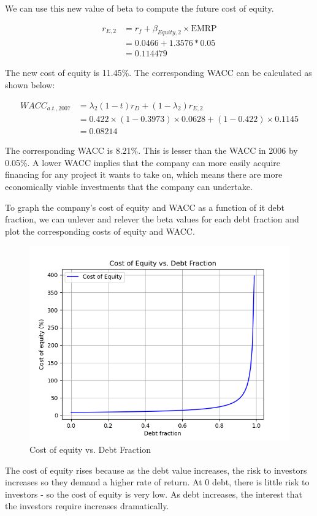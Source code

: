 \documentclass[letterpaper]{article}
\begin{document}
We can use this new value of beta to compute the future cost of equity.

\begin{align*}
r_{E,2} &= r_f + \beta_{Equity, 2} \times \text{EMRP} \\
    &= 0.0466 + 1.3576 * 0.05 \\
    &= 0.114479
\end{align*}

The new cost of equity is 11.45\%. The corresponding WACC can be calculated as shown below:

\begin{align*}
WACC_{a.t., 2007} &= \lambda_2 (1-t) r_D + (1-\lambda_2)r_{E,2} \\
            &= 0.422 \times (1 - 0.3973) \times 0.0628 + (1 - 0.422) \times 0.1145 \\
            &= 0.08214
\end{align*}

The corresponding WACC is 8.21\%. This is lesser than the WACC in 2006 by 0.05\%. A lower WACC implies that the company can more easily acquire financing for any project it wants to take on, which means there are more economically viable investments that the company can undertake.

To graph the company's cost of equity and WACC as a function of it debt fraction, we can unlever and relever the beta values for each debt fraction and plot the corresponding costs of equity and WACC.

\begin{figure}[H]
    \includegraphics[width=\linewidth]{images/cost_of_equity.png}
    \caption{Cost of equity vs. Debt Fraction}
\end{figure}

The cost of equity rises because as the debt value increases, the risk to investors increases so they demand a higher rate of return. At 0 debt, there is little risk to investors - so the cost of equity is very low. As debt increases, the interest that the investors require increases dramatically.
\end{document}
